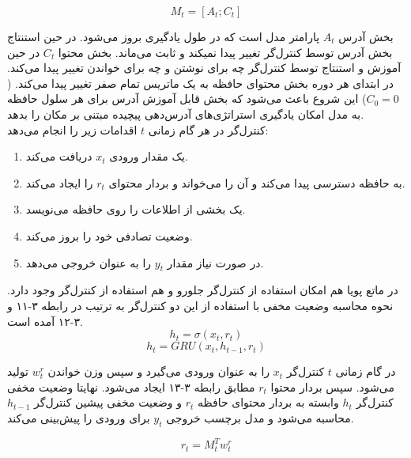 \begin{equation}
M_t = [A_t; C_t]
\end{equation} 

بخش آدرس $A_t$ پارامتر مدل است که در طول یادگیری بروز می‌شود. در حین استنتاج بخش آدرس توسط کنترل‌گر تغییر پیدا نمیکند و ثابت می‌ماند. بخش محتوا $C_t$ در حین آموزش و استنتاج توسط کنترل‌گر چه برای نوشتن و چه برای خواندن تغییر پیدا می‌کند. در ابتدای هر دوره بخش محتوای حافظه به یک ماتریس تمام صفر تغییر پیدا می‌کند. ($C_0 = 0$) این شروع باعث می‌شود که بخش قابل آموزش آدرس برای هر سلول حافظه به مدل امکان یادگیری استراتژی‌های آدرس‌دهی پیچیده مبتنی بر مکان را بدهد.\cite{gulcehre2018dynamic}
\\

کنترل‌گر در هر گام زمانی $t$ اقدامات زیر را انجام می‌دهد:
\begin{enumerate}
\item یک مقدار ورودی $x_t$ دریافت می‌کند.
\item به حافظه دسترسی پیدا می‌کند و آن را می‌خواند و بردار محتوای $r_t$ را ایجاد می‌کند.
\item یک بخشی از اطلاعات را روی حافظه می‌نویسد.
\item وضعیت تصادفی خود را بروز می‌کند.
\item در صورت نیاز مقدار $y_t$ را به عنوان خروجی می‌دهد.
\end{enumerate}

در ماتع پویا هم امکان استفاده از کنترل‌گر جلورو و هم استفاده از کنترل‌گر  وجود دارد. نحوه محاسبه وضعیت مخفی با استفاده از این دو کنترل‌گر به ترتیب در رابطه ۳-۱۱ و ۳-۱۲ آمده است.\cite{gulcehre2018dynamic}
\begin{equation}
h_t = \sigma(x_t, r_t)
\end{equation}
\begin{equation}
h_t = GRU(x_t, h_{t-1}, r_t)
\end{equation}

در گام زمانی $t$ کنترل‌گر $x_t$‌ را به عنوان ورودی می‌گیرد و سپس وزن خواندن $w_t^r$ تولید می‌شود. سپس بردار محتوا $r_t$ مطابق رابطه ۳-۱۳ ایجاد می‌شود. نهایتا وضعیت مخفی کنترل‌گر $h_t$ وابسته به بردار محتوای حافظه $r_t$ و وضعیت مخفی پیشین کنترل‌گر $h_{t-1}$ محاسبه می‌شود و مدل برچسب خروجی $y_t$ برای ورودی را پیش‌بینی می‌کند.\cite{gulcehre2018dynamic}

\begin{equation}
r_t = M_t^Tw_t^r
\end{equation}
  

